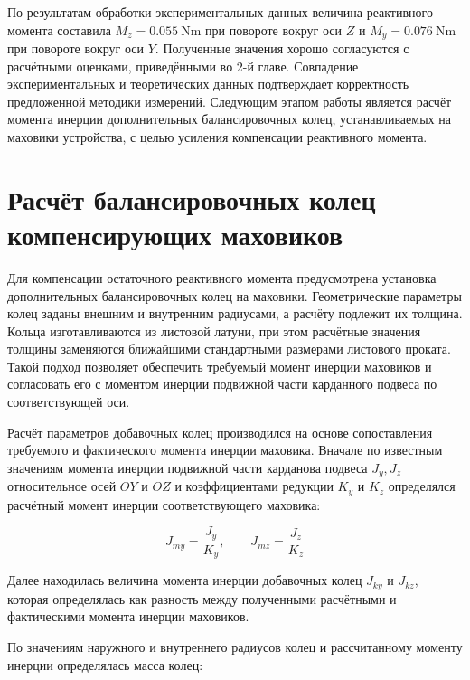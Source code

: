 По результатам обработки экспериментальных данных величина реактивного момента составила $M_z = \SI{0,055}{\newton\meter}$ при повороте вокруг оси $Z$ и $M_y = \SI{0,076}{\newton\meter}$ при повороте вокруг оси $Y$. Полученные значения  хорошо согласуются с расчётными оценками, приведёнными во 2-й главе. Совпадение экспериментальных и теоретических данных подтверждает корректность предложенной методики измерений.
Следующим этапом работы является расчёт момента инерции дополнительных балансировочных колец, устанавливаемых на маховики устройства, с целью усиления компенсации реактивного момента.

\section{Расчёт балансировочных колец компенсирующих маховиков}



Для компенсации остаточного реактивного момента предусмотрена установка дополнительных балансировочных колец на маховики. Геометрические параметры колец заданы внешним и внутренним радиусами, а расчёту подлежит их толщина. Кольца изготавливаются из листовой латуни, при этом расчётные значения толщины заменяются ближайшими стандартными размерами листового проката. Такой подход позволяет обеспечить требуемый момент инерции маховиков и согласовать его с моментом инерции подвижной части карданного подвеса по соответствующей оси.




Расчёт параметров добавочных колец производился на основе сопоставления требуемого и фактического момента инерции маховика. Вначале по известным значениям момента инерции подвижной части карданова подвеса $J_y, J_z$ относительное осей $OY$ и $OZ$ и коэффициентами редукции $K_y$ и $K_z$ определялся расчётный момент инерции соответствующего маховика:

\begin{equation}
	\label{eq:inertia_flywell_calc}
	J_{my} = \frac{J_y}{K_y}, \quad \quad J_{mz}=\frac{J_z}{K_z}
	\end{equation}
	
Далее находилась величина момента инерции добавочных колец $J_{ky}$ и $J_{kz}$, которая определялась как разность между полученными расчётными и фактическими момента инерции маховиков.

По значениям наружного и внутреннего радиусов колец и рассчитанному моменту инерции определялась масса колец:

